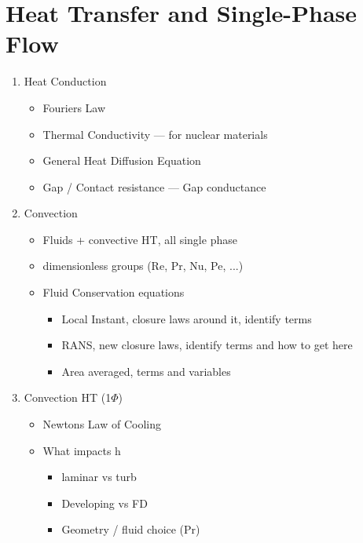 \documentclass{article}
\begin{document}
\newpage
\section{Heat Transfer and Single-Phase Flow}
\begin{enumerate}
    \item Heat Conduction
    \begin{itemize}
        \item Fouriers Law
        \item Thermal Conductivity --- for nuclear materials
        \item General Heat Diffusion Equation
        \item Gap / Contact resistance --- Gap conductance
    \end{itemize}
    \item Convection 
    \begin{itemize}
        \item Fluids + convective HT, all single phase
        \item dimensionless groups (Re, Pr, Nu, Pe, ...)
        \item Fluid Conservation equations
        \begin{itemize}
            \item Local Instant, closure laws around it, identify terms
            \item RANS, new closure laws, identify terms and how to get here
            \item Area averaged, terms and variables
        \end{itemize}
    \end{itemize}
    \item Convection HT (1$\Phi$)
    \begin{itemize}
        \item Newtons Law of Cooling
        \item What impacts h
        \begin{itemize}
            \item laminar vs turb
            \item Developing vs FD
            \item Geometry / fluid choice (Pr)
        \end{itemize}
    \end{itemize}
\end{enumerate}

\newpage
\end{document}
